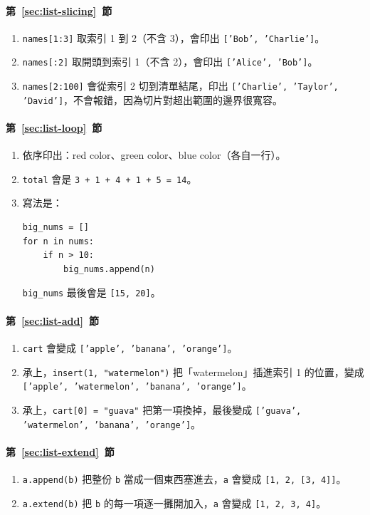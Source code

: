 \paragraph{第~\ref{sec:list-slicing}~節}
\begin{enumerate}
\item \texttt{names[1:3]} 取索引 1 到 2（不含 3），會印出
\texttt{['Bob', 'Charlie']}。
\item \texttt{names[:2]} 取開頭到索引 1（不含 2），會印出
\texttt{['Alice', 'Bob']}。
\item \texttt{names[2:100]} 會從索引 2 切到清單結尾，印出
\texttt{['Charlie', 'Taylor', 'David']}，不會報錯，因為切片對超出範圍的邊界很寬容。
\end{enumerate}

\paragraph{第~\ref{sec:list-loop}~節}
\begin{enumerate}
\item 依序印出：red color、green color、blue color（各自一行）。
\item \texttt{total} 會是 \texttt{3 + 1 + 4 + 1 + 5 = 14}。
\item 寫法是：
\begin{verbatim}
big_nums = []
for n in nums:
    if n > 10:
        big_nums.append(n)
\end{verbatim}
\texttt{big\_nums} 最後會是 \texttt{[15, 20]}。
\end{enumerate}

\paragraph{第~\ref{sec:list-add}~節}
\begin{enumerate}
\item \texttt{cart} 會變成 \texttt{['apple', 'banana', 'orange']}。
\item 承上，\texttt{insert(1, "watermelon")} 把「watermelon」插進索引 1 的位置，變成
\texttt{['apple', 'watermelon', 'banana', 'orange']}。
\item 承上，\texttt{cart[0] = "guava"} 把第一項換掉，最後變成
\texttt{['guava', 'watermelon', 'banana', 'orange']}。
\end{enumerate}

\paragraph{第~\ref{sec:list-extend}~節}
\begin{enumerate}
\item \texttt{a.append(b)} 把整份 \texttt{b} 當成一個東西塞進去，\texttt{a} 會變成
\texttt{[1, 2, [3, 4]]}。
\item \texttt{a.extend(b)} 把 \texttt{b} 的每一項逐一攤開加入，\texttt{a} 會變成
\texttt{[1, 2, 3, 4]}。
\end{enumerate}

